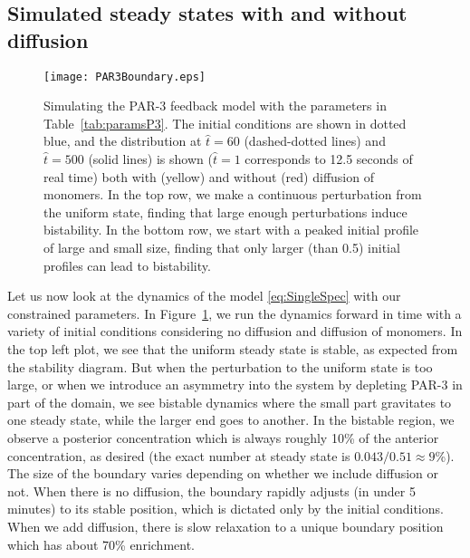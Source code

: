 \documentclass[11pt]{article}
\newcommand{\6}[1]{#1_{\text{6}}}
\newcommand{\3}[1]{#1_{\text{3}}}
\begin{document}
\subsection{Simulated steady states with and without diffusion}
\begin{figure}
\centering
\texttt{[image: PAR3Boundary.eps]}
\caption{\label{fig:P3FBBd}Simulating the PAR-3 feedback model with the parameters in Table\ \ref{tab:paramsP3}. The initial conditions are shown in dotted blue, and the distribution at $\hat t = 60$ (dashed-dotted lines) and $\hat t = 500$ (solid lines) is shown ($\hat t =1$ corresponds to 12.5 seconds of real time) both with (yellow) and without (red) diffusion of monomers. In the top row, we make a continuous perturbation from the uniform state, finding that large enough perturbations induce bistability. In the bottom row, we start with a peaked initial profile of large and small size, finding that only larger (than 0.5) initial profiles can lead to bistability. }
\end{figure}

Let us now look at the dynamics of the model \eqref{eq:SingleSpec} with our constrained parameters. In Figure\ \ref{fig:P3FBBd}, we run the dynamics forward in time with a variety of initial conditions considering no diffusion and diffusion of monomers. In the top left plot, we see that the uniform steady state is stable, as expected from the stability diagram. But when the perturbation to the uniform state is too large, or when we introduce an asymmetry into the system by depleting PAR-3 in part of the domain, we see bistable dynamics where the small part gravitates to one steady state, while the larger end goes to another. In the bistable region, we observe a posterior concentration which is always roughly 10\% of the anterior concentration, as desired (the exact number at steady state is $0.043/0.51 \approx 9$\%). The size of the boundary varies depending on whether we include diffusion or not. When there is no diffusion, the boundary rapidly adjusts (in under 5 minutes) to its stable position, which is dictated only by the initial conditions. When we add diffusion, there is slow relaxation to a unique boundary position which has about 70\% enrichment. 
\end{document}
